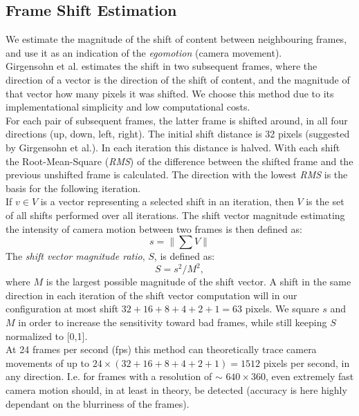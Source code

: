 \subsection{Frame Shift Estimation}\label{sec:frame_shift_estimation}
%
We estimate the magnitude of the shift of content between neighbouring frames, and use it as an indication of the \textit{egomotion} (camera movement).\\
Girgensohn et al.\cite{Girgensohn:2000:SAH:354401.354415} estimates the shift in two subsequent frames, where the direction of a vector is the direction of the shift of content, and the magnitude of that vector how many pixels it was shifted. We choose this method due to its implementational simplicity and low computational costs.\\
For each pair of subsequent frames, the latter frame is shifted around, in all four directions (up, down, left, right). The initial shift distance is 32 pixels (suggested by Girgensohn et al.). In each iteration this distance is halved. With each shift the Root-Mean-Square (\textit{RMS}) of the difference between the shifted frame and the previous unshifted frame is calculated. The direction with the lowest \textit{RMS} is the basis for the following iteration.\\
If $v \in V$ is a vector representing a selected shift in an iteration, then $V$ is the set of all shifts performed over all iterations. The shift vector magnitude estimating the intensity of camera motion between two frames is then defined as:
%
\[
s = \|\sum V\|
\]
%
The \textit{shift vector magnitude ratio}, $S$, is defined as:
%
\[
S = s^2 / M^2, 
\]
%
where $M$ is the largest possible magnitude of the shift vector. A shift in the same direction in each iteration of the shift vector computation will in our configuration at most shift $32+16+8+4+2+1=63$ pixels. We square $s$ and $M$ in order to increase the sensitivity toward bad frames, while still keeping $S$ normalized to [0,1].\\
%
At 24 frames per second (fps) this method can theoretically trace camera movements of up to $24 \times (32+16+8+4+2+1) = 1512$ pixels per second, in any direction. I.e. for frames with a resolution of $\sim$ $640\times360$, even extremely fast camera motion should, in at least in theory, be detected (accuracy is here highly dependant on the blurriness of the frames).
%
